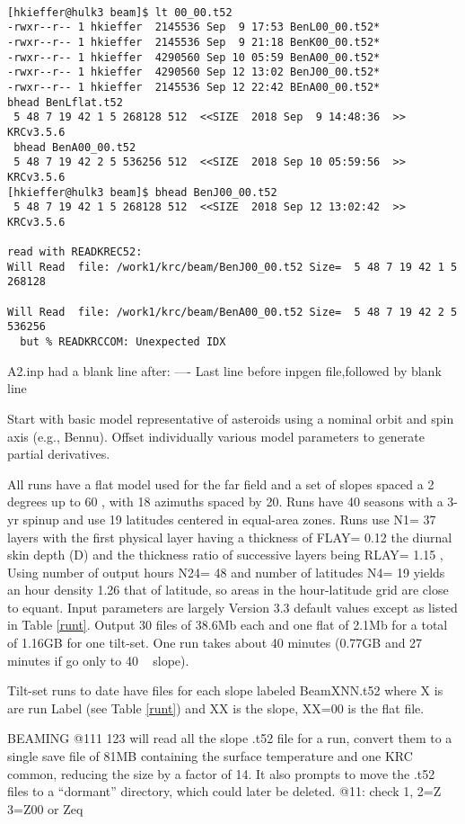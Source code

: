 \documentclass{article}
\begin{document}
\begin{verbatim}

[hkieffer@hulk3 beam]$ lt 00_00.t52
-rwxr--r-- 1 hkieffer  2145536 Sep  9 17:53 BenL00_00.t52*
-rwxr--r-- 1 hkieffer  2145536 Sep  9 21:18 BenK00_00.t52*
-rwxr--r-- 1 hkieffer  4290560 Sep 10 05:59 BenA00_00.t52*
-rwxr--r-- 1 hkieffer  4290560 Sep 12 13:02 BenJ00_00.t52*
-rwxr--r-- 1 hkieffer  2145536 Sep 12 22:42 BEnA00_00.t52*
bhead BenLflat.t52
 5 48 7 19 42 1 5 268128 512  <<SIZE  2018 Sep  9 14:48:36  >>  KRCv3.5.6
 bhead BenA00_00.t52
 5 48 7 19 42 2 5 536256 512  <<SIZE  2018 Sep 10 05:59:56  >>  KRCv3.5.6
[hkieffer@hulk3 beam]$ bhead BenJ00_00.t52
 5 48 7 19 42 1 5 268128 512  <<SIZE  2018 Sep 12 13:02:42  >>  KRCv3.5.6

read with READKREC52:
Will Read  file: /work1/krc/beam/BenJ00_00.t52 Size=  5 48 7 19 42 1 5 268128

Will Read  file: /work1/krc/beam/BenA00_00.t52 Size=  5 48 7 19 42 2 5 536256
  but % READKRCCOM: Unexpected IDX
\end{verbatim}  

 A2.inp had a blank line after: ---- Last line before inpgen file,followed by blank line

 Start with basic model representative of asteroids using a nominal orbit and
 spin axis (e.g., Bennu). Offset individually various model parameters to
 generate partial derivatives.

 All runs have a flat model used for the far field and a set of slopes spaced a
 2 degrees up to 60 \qd, with 18 azimuths spaced by 20\qd. Runs have 40 seasons
 with a 3-yr spinup and use 19 latitudes centered in equal-area zones. Runs use
 N1= 37 layers with the first physical layer having a thickness of FLAY= 0.12
 the diurnal skin depth (D) and the thickness ratio of successive layers being
 RLAY= 1.15 , Using number of output hours N24= 48 and number of latitudes N4=
 19 yields an hour density 1.26 that of latitude, so areas in the hour-latitude
 grid are close to equant.  Input parameters are largely Version 3.3 default
 values except as listed in Table \ref{runt}. Output 30 files of 38.6Mb each and
 one flat of 2.1Mb for a total of 1.16GB for one tilt-set. One run takes about
 40 minutes (0.77GB and 27 minutes if go only to 40 \qd~ slope).

Tilt-set runs to date have files for each slope labeled BeamXNN.t52 where X is
are run Label (see Table \ref{runt}) and XX is the slope, XX=00 is the flat
file.

BEAMING @111 123 will read all the slope .t52 file for a run, convert them to a
single save file of 81MB containing the surface temperature and one KRC common,
reducing the size by a factor of 14. It also prompts to move the .t52 files to a
``dormant'' directory, which could later be deleted.  
\qi @11: check 1, 2=Z 3=Z00 or Zeq
\end{document}
